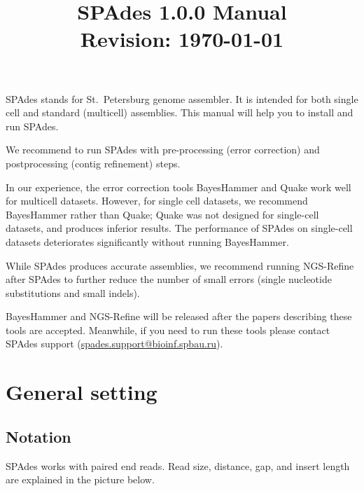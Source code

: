 \documentclass{article}
\def\spades{SPAdes}
\begin{document}
\title{{\spades} 1.0.0 Manual\\{\small Revision: \today}}
\date{}
\maketitle

{\spades} stands for St.~Petersburg genome assembler.
It is intended for both single cell and standard (multicell) 
assemblies. This manual will help you to install and run
{\spades}.

We recommend to run {\spades} with pre-processing (error correction) and postprocessing (contig refinement) steps.

In our experience, the error correction tools BayesHammer and Quake work well for multicell datasets. 
However, for single cell datasets, we recommend BayesHammer rather than Quake; 
Quake was not designed for single-cell datasets, and produces inferior results. 
The performance of {\spades} on single-cell datasets deteriorates 
significantly without running BayesHammer. 

While {\spades} produces accurate assemblies, 
we recommend running NGS-Refine after {\spades} to further reduce the number of 
small errors (single nucleotide substitutions and small indels).

BayesHammer and NGS-Refine will be released after the papers describing these tools are accepted. 
Meanwhile, if you need to run these tools please contact SPAdes support (\url{spades.support@bioinf.spbau.ru}).


\renewcommand{\contentsname}{}
\tableofcontents



\pagebreak

\section{General setting}
\subsection{Notation}
{\spades} works with paired end reads.
Read size, distance, gap, and insert length are 
explained in the picture below.

\begin{center}
\end{center}
\end{document}
